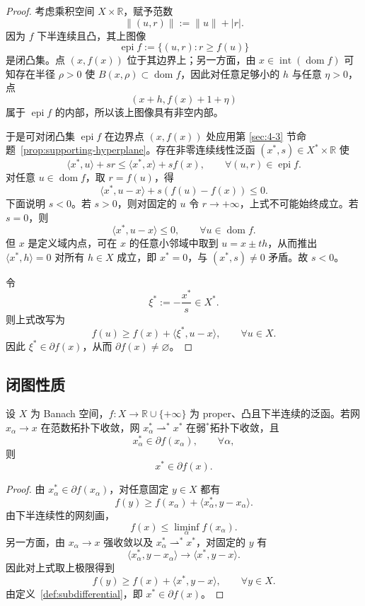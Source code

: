 \begin{proof}
考虑乘积空间 $X\times \mathbb R$，赋予范数
\[
\|(u,r)\|:=\|u\|+|r|.
\]
因为 $f$ 下半连续且凸，其上图像
\[
\operatorname{epi}f:=\{(u,r):r\ge f(u)\}
\]
是闭凸集。点 $(x,f(x))$ 位于其边界上；另一方面，由 $x\in \operatorname{int}(\operatorname{dom}f)$ 可知存在半径 $\rho>0$ 使 $B(x,\rho)\subset \operatorname{dom}f$，因此对任意足够小的 $h$ 与任意 $\eta>0$，点
\[
(x+h,f(x)+1+\eta)
\]
属于 $\operatorname{epi}f$ 的内部，所以该上图像具有非空内部。

于是可对闭凸集 $\operatorname{epi}f$ 在边界点 $(x,f(x))$ 处应用第 \ref{sec:4-3} 节命题~\ref{prop:supporting-hyperplane}。存在非零连续线性泛函 $(x^\ast,s)\in X^\ast\times \mathbb R$ 使
\[
\langle x^\ast,u\rangle + sr
\le
\langle x^\ast,x\rangle + s f(x),
\qquad \forall (u,r)\in \operatorname{epi}f.
\]
对任意 $u\in \operatorname{dom}f$，取 $r=f(u)$，得
\[
\langle x^\ast,u-x\rangle + s(f(u)-f(x))\le 0.
\]
下面说明 $s<0$。若 $s>0$，则对固定的 $u$ 令 $r\to +\infty$，上式不可能始终成立。若 $s=0$，则
\[
\langle x^\ast,u-x\rangle\le 0,\qquad \forall u\in \operatorname{dom}f.
\]
但 $x$ 是定义域内点，可在 $x$ 的任意小邻域中取到 $u=x\pm th$，从而推出 $\langle x^\ast,h\rangle=0$ 对所有 $h\in X$ 成立，即 $x^\ast=0$，与 $(x^\ast,s)\neq 0$ 矛盾。故 $s<0$。

令
\[
\xi^\ast:=-\frac{x^\ast}{s}\in X^\ast.
\]
则上式改写为
\[
f(u)\ge f(x)+\langle \xi^\ast,u-x\rangle,\qquad \forall u\in X.
\]
因此 $\xi^\ast\in \partial f(x)$，从而 $\partial f(x)\neq\varnothing$。
\end{proof}

\subsection{闭图性质}

\begin{proposition}[次微分的闭图性质]\label{prop:subdifferential-closed-graph}
设 $X$ 为 Banach 空间，$f\colon X\to \mathbb R\cup\{+\infty\}$ 为 proper、凸且下半连续的泛函。若网 $x_\alpha\to x$ 在范数拓扑下收敛，网 $x_\alpha^\ast\rightharpoonup^\ast x^\ast$ 在弱$^\ast$拓扑下收敛，且
\[
x_\alpha^\ast\in \partial f(x_\alpha),\qquad \forall \alpha,
\]
则
\[
x^\ast\in \partial f(x).
\]
\end{proposition}

\begin{proof}
由 $x_\alpha^\ast\in \partial f(x_\alpha)$，对任意固定 $y\in X$ 都有
\[
f(y)\ge f(x_\alpha)+\langle x_\alpha^\ast,y-x_\alpha\rangle.
\]
由下半连续性的网刻画，
\[
f(x)\le \liminf_\alpha f(x_\alpha).
\]
另一方面，由 $x_\alpha\to x$ 强收敛以及 $x_\alpha^\ast\rightharpoonup^\ast x^\ast$，对固定的 $y$ 有
\[
\langle x_\alpha^\ast,y-x_\alpha\rangle
\to
\langle x^\ast,y-x\rangle.
\]
因此对上式取上极限得到
\[
f(y)\ge f(x)+\langle x^\ast,y-x\rangle,\qquad \forall y\in X.
\]
由定义~\ref{def:subdifferential}，即 $x^\ast\in \partial f(x)$。
\end{proof}

